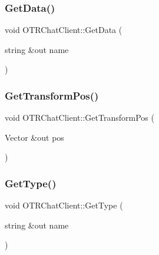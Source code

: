 \hypertarget{class_o_t_r_chat_client_a801a5a877cb251882b094b9739a41049}{}\label{class_o_t_r_chat_client_a801a5a877cb251882b094b9739a41049} 
\subsubsection{\texorpdfstring{Get\+Data()}{GetData()}}
{\footnotesize\ttfamily void O\+T\+R\+Chat\+Client\+::\+Get\+Data (\begin{DoxyParamCaption}\item[{string \&out}]{name }\end{DoxyParamCaption})}

\hypertarget{class_o_t_r_chat_client_a5599bc1f3ae401972028ce68b9b74c2f}{}\label{class_o_t_r_chat_client_a5599bc1f3ae401972028ce68b9b74c2f} 
\subsubsection{\texorpdfstring{Get\+Transform\+Pos()}{GetTransformPos()}}
{\footnotesize\ttfamily void O\+T\+R\+Chat\+Client\+::\+Get\+Transform\+Pos (\begin{DoxyParamCaption}\item[{Vector \&out}]{pos }\end{DoxyParamCaption})}

\hypertarget{class_o_t_r_chat_client_a215b98baed5f7b536a5c3133caca8768}{}\label{class_o_t_r_chat_client_a215b98baed5f7b536a5c3133caca8768} 
\subsubsection{\texorpdfstring{Get\+Type()}{GetType()}}
{\footnotesize\ttfamily void O\+T\+R\+Chat\+Client\+::\+Get\+Type (\begin{DoxyParamCaption}\item[{string \&out}]{name }\end{DoxyParamCaption})}

\hypertarget{class_o_t_r_chat_client_abcd18a99563d074369402c16f9843649}{}\label{class_o_t_r_chat_client_abcd18a99563d074369402c16f9843649} 
